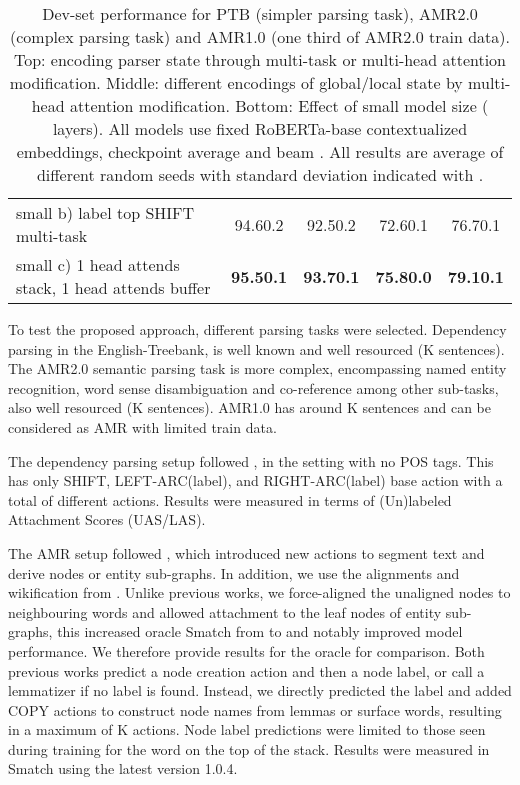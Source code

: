 \documentclass[11pt,a4paper]{article}
\begin{document}
\begin{table*}[ht!]
{\begin{tabular}{l|c|c|c|c}
small b) label top  SHIFT multi-task                & 94.6\footnotesize{0.2}  & 92.5\footnotesize{0.2} & 72.6\footnotesize{0.1}& 76.7\footnotesize{0.1}\\
small c)  1 head attends stack, 1 head attends buffer    & {\bf 95.5\footnotesize{0.1}}  & {\bf 93.7\footnotesize{0.1}} & {\bf 75.8\footnotesize{0.0}}& {\bf 79.1\footnotesize{0.1}}\\
\hline
\end{tabular}
}
\caption{Dev-set performance for PTB (simpler parsing task), AMR2.0 (complex parsing task) and AMR1.0 (one third of AMR2.0 train data). Top: encoding parser state through multi-task or multi-head attention modification. Middle: different encodings of global/local state by multi-head attention modification. Bottom: Effect of small model size ( layers). All models use fixed RoBERTa-base contextualized embeddings, checkpoint average and beam . All results are average of  different random seeds with standard deviation indicated with .}
\label{table:dev}
\end{table*}

To test the proposed approach, different parsing tasks were selected. Dependency parsing in the English-Treebank, is well known and well resourced (K sentences). The AMR2.0 semantic parsing task is more complex, encompassing named entity recognition, word sense disambiguation and co-reference among other sub-tasks, also well resourced (K sentences). AMR1.0 has around K sentences and can be considered as AMR with limited train data. 

The dependency parsing setup followed \citet{dyer2015transition}, in the setting with no POS tags. This has only \textrm{SHIFT}, \textrm{LEFT-ARC(label)}, and \textrm{RIGHT-ARC(label)} base action with a total of  different actions. Results were measured in terms of (Un)labeled Attachment Scores (UAS/LAS).

The AMR setup followed \citet{ballesteros2017amr}, which introduced new actions to segment text and derive nodes or entity sub-graphs. In addition, we use the alignments and wikification from \citet{naseem2019rewarding}. Unlike previous works, we force-aligned the unaligned nodes to neighbouring words and allowed attachment to the leaf nodes of entity sub-graphs, this increased oracle Smatch from  to  and notably improved model performance. We therefore provide results for the  oracle for comparison. Both previous works predict a node creation action and then a node label, or call a lemmatizer if no label is found. Instead, we directly predicted the label and added \textrm{COPY} actions to construct node names from lemmas\footnotemark{} or surface words, resulting in a maximum of K actions. Node label predictions were limited to those seen during training for the word on the top of the stack. Results were measured in Smatch \cite{cai-knight-2013-smatch} using the latest version \textrm{1.0.4}\footnotemark{}. 
\end{document}
